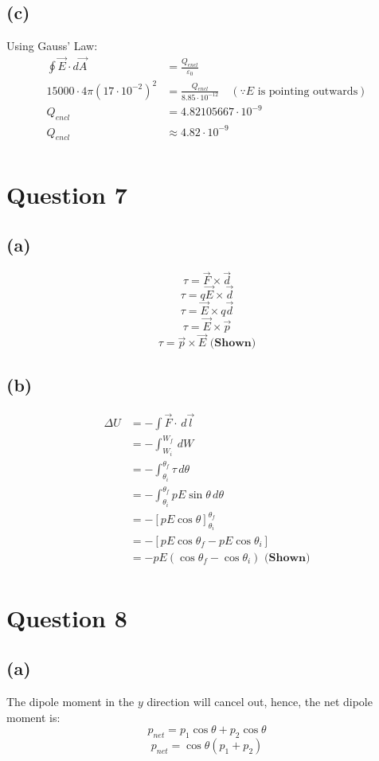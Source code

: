 \documentclass[11pt]{article}
\begin{document}
\subsection{(c)}
\label{sec:orgabdbbbe}
Using Gauss' Law:
\begin{align*}
\oint \vec{E} \cdot d \vec{A} &= \frac{Q_{encl}}{\varepsilon_0} \\
15000 \cdot 4 \pi (17 \cdot 10^{-2})^2 &= \frac{Q_{encl}}{8.85 \cdot 10^{-12}} \quad (\because E \text{ is pointing outwards}) \\
Q_{encl} &= 4.82105667 \cdot 10^{-9} \\
Q_{encl} &\approx 4.82 \cdot 10^{-9} \\
\end{align*}
\section{Question 7}
\label{sec:orgb3dd833}

\subsection{(a)}
\label{sec:orge165c4a}
\[\tau = \vec{F} \times \vec{d}\]
\[\tau = q\vec{E} \times \vec{d}\]
\[\tau = \vec{E} \times q\vec{d}\]
\[\tau = \vec{E} \times \vec{p}\]
\[\tau = \vec{p} \times \vec{E} \textbf{ (Shown)}\]
\subsection{(b)}
\label{sec:org769d96c}
\begin{align*}
\Delta U &= - \int \vec{F} \cdot \, d \vec{l} \\
&= - \int_{W_i}^{W_f} \, dW \\
&= - \int_{\theta_i}^{\theta_f} \tau \, d \theta \\
&= - \int_{\theta_i}^{\theta_f} pE \sin \theta \, d \theta \\
&= - [pE \cos \theta]_{\theta_i}^{\theta_f} \\
&= - [pE \cos \theta_f - pE \cos \theta_i ] \\
&= - pE(\cos \theta_f - \cos \theta_i) \textbf{ (Shown)} \\
\end{align*}
\section{Question 8}
\label{sec:orgc881b74}

\subsection{(a)}
\label{sec:orgaa1d25f}
The dipole moment in the \(y\) direction will cancel out, hence, the net dipole moment is:
\[p_{net} = p_1 \cos \theta + p_2 \cos \theta\]
\[p_{net} = \cos \theta (p_1 + p_2) \]
\end{document}
